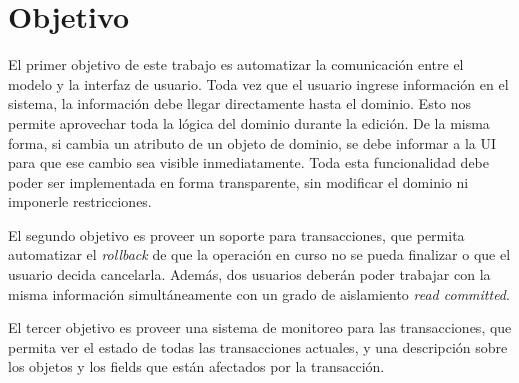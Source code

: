 \section{Objetivo}
\label{sec:Objetivo}
El primer objetivo de este trabajo es automatizar la comunicación entre el
modelo y la interfaz de usuario.
Toda vez que el usuario ingrese información en el sistema, la
información debe llegar directamente hasta el dominio. Esto nos permite
aprovechar toda la lógica del dominio durante la edición.
De la misma forma, si cambia un atributo de un objeto de dominio, se debe
informar a la UI para que ese cambio sea visible
inmediatamente.
Toda esta funcionalidad debe poder ser implementada en forma transparente,
sin modificar el dominio ni imponerle restricciones.

El segundo objetivo es proveer un soporte para transacciones, que
permita automatizar el \emph{rollback} de que la operación en curso no se pueda
finalizar o que el usuario decida cancelarla.
Además, dos usuarios deberán poder trabajar con la misma información
simultáneamente con un grado de aislamiento \emph{read committed}.

El tercer objetivo es proveer una sistema de monitoreo para las transacciones,
que permita ver el estado de todas las transacciones actuales, y una descripción
sobre los objetos y los fields que están afectados por la transacción.
